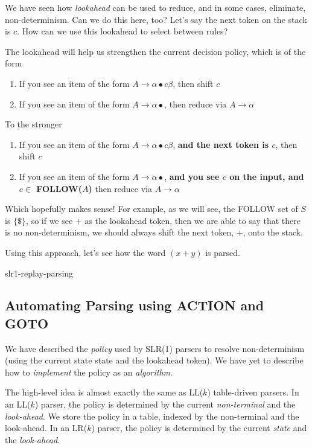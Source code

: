 We have seen how \textit{lookahead} can be used to reduce, and in some cases, eliminate, non-determinism. Can we do this here, too? Let's say the next token on the stack is $c$. How can we use this lookahead to select between rules?

The lookahead will help us strengthen the current decision policy, which is of the form
\begin{enumerate}
    \item If you see an item of the form $A \to \alpha \bullet c \beta$, then shift $c$
    \item If you see an item of the form $A \to \alpha \bullet$, then reduce via $A \to \alpha$
\end{enumerate}
To the stronger
\begin{enumerate}
    \item If you see an item of the form $A \to \alpha \bullet c \beta$, \textbf{and the next token is $c$}, then shift $c$
    \item If you see an item of the form $A \to \alpha \bullet$, \textbf{and you see $c$ on the input, and $c \in$ FOLLOW($A$)} then reduce via $A \to \alpha$
\end{enumerate}
Which hopefully makes sense! For example, as we will see, the FOLLOW set of $S$ is $\{\$\}$, so if we see $+$ as the lookahead token, then we are able to say that there is no non-determinism, we should always shift the next token, $+$, onto the stack. 

Using this approach, let's see how the word $(x+y)$ is parsed.

\begin{center}
    {slr1-replay-parsing}
\end{center}

\subsection{Automating Parsing using ACTION and GOTO}
We have described the \textit{policy} used by SLR(1) parsers to resolve non-determinism (using the current state state and the lookahead token). We have yet to describe how to \textit{implement} the policy as an \textit{algorithm}.

The high-level idea is almost exactly the same as LL($k$) table-driven parsers. In an LL($k$) parser, the policy is determined by the current \textit{non-terminal} and the \textit{look-ahead}. We store the policy in a table, indexed by the non-terminal and the look-ahead. In an LR($k$) parser, the policy is determined by the current \textit{state} and the \textit{look-ahead}. 

